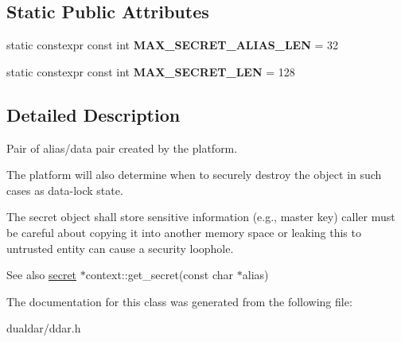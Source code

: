 \subsection*{\-Static \-Public \-Attributes}
\begin{DoxyCompactItemize}
\item 
\hypertarget{classddar_1_1secret_ae1b531a384d9565cc0021ec516030461}{static constexpr const int {\bfseries \-M\-A\-X\-\_\-\-S\-E\-C\-R\-E\-T\-\_\-\-A\-L\-I\-A\-S\-\_\-\-L\-E\-N} = 32}\label{classddar_1_1secret_ae1b531a384d9565cc0021ec516030461}

\item 
\hypertarget{classddar_1_1secret_a1623a1e74b76b791d2e23bf963a2d25c}{static constexpr const int {\bfseries \-M\-A\-X\-\_\-\-S\-E\-C\-R\-E\-T\-\_\-\-L\-E\-N} = 128}\label{classddar_1_1secret_a1623a1e74b76b791d2e23bf963a2d25c}

\end{DoxyCompactItemize}


\subsection{\-Detailed \-Description}
\-Pair of alias/data pair created by the platform. 

\-The platform will also determine when to securely destroy the object in such cases as data-\/lock state.

\-The secret object shall store sensitive information (e.\-g., master key) caller must be careful about copying it into another memory space or leaking this to untrusted entity can cause a security loophole.

\begin{DoxySeeAlso}{\-See also}
\hyperlink{classddar_1_1secret}{secret} $\ast$context\-::get\-\_\-secret(const char $\ast$alias) 
\end{DoxySeeAlso}


\-The documentation for this class was generated from the following file\-:\begin{DoxyCompactItemize}
\item 
dualdar/ddar.\-h\end{DoxyCompactItemize}
